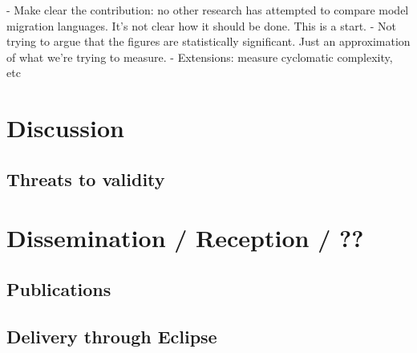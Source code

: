 - Make clear the contribution: no other research has attempted to compare model migration languages. It's not clear how it should be done. This is a start. 
- Not trying to argue that the figures are statistically significant. Just an approximation of what we're trying to measure.
- Extensions: measure cyclomatic complexity, etc




\section{Discussion}

\subsection{Threats to validity}



\section{Dissemination / Reception / ??}

\subsection{Publications}



\subsection{Delivery through Eclipse}

